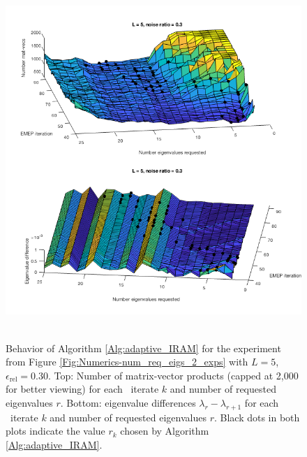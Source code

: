 \begin{figure}[H]
\centering
\hbox{\hspace{-0.2cm} \includegraphics[scale=0.65]{Numerics-surf_num_mvs_and_eig_diffs_2} }\vspace{0.0cm}
	\caption{Behavior of Algorithm \ref{Alg:adaptive_IRAM} for the experiment from Figure \ref{Fig:Numerics-num_req_eigs_2_exps} with $L=5$, $\epsilon_\text{rel}=0.30$.  Top: Number of matrix-vector products (capped at 2,000 for better viewing) for each \emep \ iterate $k$ and number of requested eigenvalues $r$. Bottom: eigenvalue differences $\lambda_r - \lambda_{r+1}$ for each \emep \ iterate $k$ and number of requested eigenvalues $r$.  Black dots in both plots indicate the value $r_k$ chosen by Algorithm \ref{Alg:adaptive_IRAM}.}
\label{Fig:Numerics-surf_mvs_eig_diffs_2}
\end{figure}





